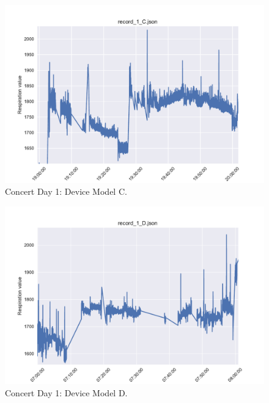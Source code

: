 \begin{figure}
    \centering
    \includegraphics[scale=0.6]{images/record_1_c.pdf}
    \caption{Concert Day 1: Device Model C.}
    \label{fig:concert_day1_c}
\end{figure}

\begin{figure}
    \centering
    \includegraphics[scale=0.6]{images/record_1_d.pdf}
    \caption{Concert Day 1: Device Model D.}
    \label{fig:concert_day1_d}
\end{figure}

